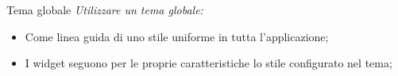 \documentclass{../libs/presentation_format}
\begin{document}

\begin{frame}{Tema globale}
	\emph{Utilizzare un tema globale:}
	\begin{itemize}
		\item Come linea guida di uno stile uniforme in tutta l'applicazione;
		\item I widget seguono per le proprie caratteristiche lo stile configurato nel tema;
	\end{itemize}
	\centering
	\href{https://api.flutter.dev/flutter/material/ThemeData-class.html}{}
\end{frame}

\end{document}

